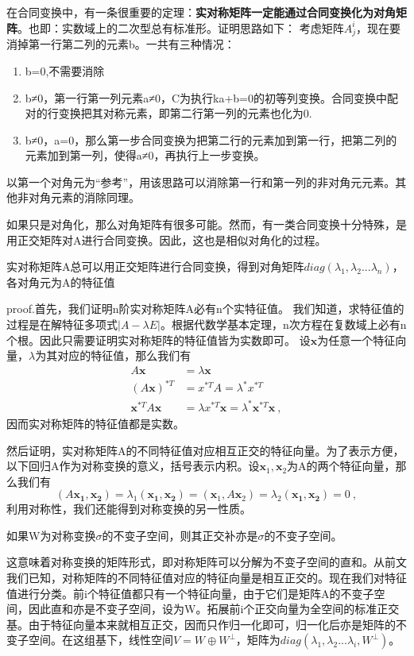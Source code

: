 在合同变换中，有一条很重要的定理：\textbf{实对称矩阵一定能通过合同变换化为对角矩阵}。也即：实数域上的二次型总有标准形。证明思路如下：
考虑矩阵$A^i_j$，现在要消掉第一行第二列的元素b。一共有三种情况：
\begin{enumerate}
\item b=0,不需要消除
\item b≠0，第一行第一列元素a≠0，C为执行ka+b=0的初等列变换。合同变换中配对的行变换把其对称元素，即第二行第一列的元素也化为0.
\item b≠0，a=0，那么第一步合同变换为把第二行的元素加到第一行，把第二列的元素加到第一列，使得a≠0，再执行上一步变换。
\end{enumerate}
以第一个对角元为“参考”，用该思路可以消除第一行和第一列的非对角元元素。其他非对角元素的消除同理。

如果只是对角化，那么对角矩阵有很多可能。然而，有一类合同变换十分特殊，是用正交矩阵对A进行合同变换。因此，这也是相似对角化的过程。
\begin{theorem}{}
实对称矩阵A总可以用正交矩阵进行合同变换，得到对角矩阵$diag(\lambda_1,\lambda_2...\lambda_n)$，各对角元为A的特征值
\end{theorem}  

proof.首先，我们证明n阶实对称矩阵A必有n个实特征值。
我们知道，求特征值的过程是在解特征多项式$|A-\lambda E|$。根据代数学基本定理，n次方程在复数域上必有n个根。因此只需要证明实对称矩阵的特征值皆为实数即可。
设$\boldsymbol x$为任意一个特征向量，$\lambda$为其对应的特征值，那么我们有
\begin{equation}
\begin{aligned}
A\boldsymbol x&=\lambda \boldsymbol x\\
(A\boldsymbol x)^{*T}&=x^{*T}A=\lambda^{*}x^{*T}\\
\boldsymbol x^{*T}A\boldsymbol x&=\lambda x^{*T}\boldsymbol x=\lambda^{*}\boldsymbol x^{*T}\boldsymbol x~,
\end{aligned}
\end{equation}
因而实对称矩阵的特征值都是实数。

然后证明，实对称矩阵A的不同特征值对应相互正交的特征向量。为了表示方便，以下回归A作为对称变换的意义，括号表示内积。设$\boldsymbol x_1,\boldsymbol x_2$为A的两个特征向量，那么我们有
$$(A\boldsymbol {x_1,x_2})=\lambda_1(\boldsymbol {x_1,x_2})=(\boldsymbol x_1,A\boldsymbol x_2)=\lambda_2(\boldsymbol{x_1,x_2})=0~,$$
利用对称性，我们还能得到对称变换的另一性质。
\begin{lemma}{}
如果W为对称变换$\sigma$的不变子空间，则其正交补亦是$\sigma$的不变子空间。
\end{lemma}
这意味着对称变换的矩阵形式，即对称矩阵可以分解为不变子空间的直和。从前文我们已知，对称矩阵的不同特征值对应的特征向量是相互正交的。现在我们对特征值进行分类。前i个特征值都只有一个特征向量，由于它们是矩阵A的不变子空间，因此直和亦是不变子空间，设为W。拓展前i个正交向量为全空间的标准正交基。由于特征向量本来就相互正交，因而只作归一化即可，归一化后亦是矩阵的不变子空间。在这组基下，线性空间$V=W\oplus W^{\perp}$，矩阵为$diag(\lambda_1,\lambda_2...\lambda_i,W^{\perp})$。

